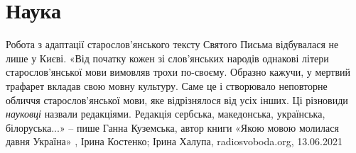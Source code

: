  
 
 
 
 
\chapter{Наука}

Робота з адаптації старослов'янського тексту Святого Письма відбувалася не лише
у Києві. «Від початку кожен зі слов'янських народів однакові літери
старослов'янської мови вимовляв трохи по-своєму. Образно кажучи, у мертвий
трафарет вкладав свою мовну культуру. Саме це і створювало неповторне обличчя
старослов'янської мови, яке відрізнялося від усіх інших. Ці різновиди
\emph{науковці} назвали редакціями. Редакція сербська, македонська, українська,
білоруська...» – пише Ганна Куземська, автор книги «Якою мовою молилася давня
Україна»
,
Ірина Костенко; Ірина Халупа, radiosvoboda.org, 13.06.2021

